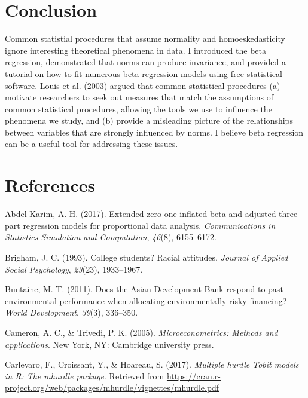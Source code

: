 \documentclass[english,man]{apa6}
\theoremstyle{definition}
\theoremstyle{definition}
\theoremstyle{remark}
\begin{document}
\section{Conclusion}\label{conclusion}

Common statistial procedures that assume normality and homoeskedasticity
ignore interesting theoretical phenomena in data. I introduced the beta
regression, demonstrated that norms can produce invariance, and provided
a tutorial on how to fit numerous beta-regression models using free
statistical software. Louis et al. (2003) argued that common statistical
procedures (a) motivate researchers to seek out measures that match the
assumptions of common statistical procedures, allowing the tools we use
to influence the phenomena we study, and (b) provide a misleading
picture of the relationships between variables that are strongly
influenced by norms. I believe beta regression can be a useful tool for
addressing these issues.

\newpage

\section{References}\label{references}

\setlength{\parindent}{-0.5in} \setlength{\leftskip}{0.5in}

\hypertarget{refs}{}
\hypertarget{ref-abdel2017extended}{}
Abdel-Karim, A. H. (2017). Extended zero-one inflated beta and adjusted
three-part regression models for proportional data analysis.
\emph{Communications in Statistics-Simulation and Computation},
\emph{46}(8), 6155--6172.

\hypertarget{ref-brigham1993college}{}
Brigham, J. C. (1993). College students? Racial attitudes. \emph{Journal
of Applied Social Psychology}, \emph{23}(23), 1933--1967.

\hypertarget{ref-buntaine2011does}{}
Buntaine, M. T. (2011). Does the Asian Development Bank respond to past
environmental performance when allocating environmentally risky
financing? \emph{World Development}, \emph{39}(3), 336--350.

\hypertarget{ref-cameron2005microeconometrics}{}
Cameron, A. C., \& Trivedi, P. K. (2005). \emph{Microeconometrics:
Methods and applications}. New York, NY: Cambridge university press.

\hypertarget{ref-carlevaro2016multiple}{}
Carlevaro, F., Croissant, Y., \& Hoareau, S. (2017). \emph{Multiple
hurdle Tobit models in R: The mhurdle package}. Retrieved from
\url{https://cran.r-project.org/web/packages/mhurdle/vignettes/mhurdle.pdf}
\end{document}
